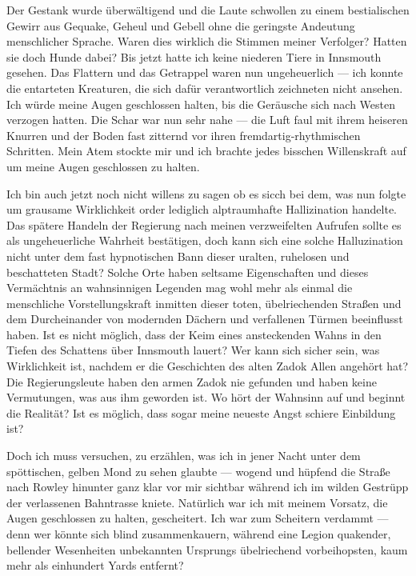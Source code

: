 Der Gestank wurde überwältigend und die Laute schwollen zu einem bestialischen Gewirr aus Gequake, Geheul und Gebell ohne die geringste Andeutung menschlicher Sprache. Waren dies wirklich die Stimmen meiner Verfolger? Hatten sie doch Hunde dabei? Bis jetzt hatte ich keine niederen Tiere in Innsmouth gesehen. Das Flattern und das Getrappel waren nun ungeheuerlich --- ich konnte die entarteten Kreaturen, die sich dafür verantwortlich zeichneten nicht ansehen. Ich würde meine Augen geschlossen halten, bis die Geräusche sich nach Westen verzogen hatten. Die Schar war nun sehr nahe --- die Luft faul mit ihrem heiseren Knurren und der Boden fast zitternd vor ihren fremdartig-rhythmischen Schritten. Mein Atem stockte mir und ich brachte jedes bisschen Willenskraft auf um meine Augen geschlossen zu halten.

Ich bin auch jetzt noch nicht willens zu sagen ob es sicch bei dem, was nun folgte um grausame Wirklichkeit order lediglich alptraumhafte Hallizination handelte. Das spätere Handeln der Regierung nach meinen verzweifelten Aufrufen sollte es als ungeheuerliche Wahrheit bestätigen, doch kann sich eine solche Halluzination nicht unter dem fast hypnotischen Bann dieser uralten, ruhelosen und beschatteten Stadt? Solche Orte haben seltsame Eigenschaften und dieses Vermächtnis an wahnsinnigen Legenden mag wohl mehr als einmal die menschliche Vorstellungskraft inmitten dieser toten, übelriechenden Straßen und dem Durcheinander von modernden Dächern und verfallenen Türmen beeinflusst haben.  Ist es nicht möglich, dass der Keim eines ansteckenden Wahns in den Tiefen des Schattens über Innsmouth lauert? Wer kann sich sicher sein, was Wirklichkeit ist, nachdem er die Geschichten des alten Zadok Allen angehört hat? Die Regierungsleute haben den armen Zadok nie gefunden und haben keine Vermutungen, was aus ihm geworden ist. Wo hört der Wahnsinn auf und beginnt die Realität? Ist es möglich, dass sogar meine neueste Angst schiere Einbildung ist?

Doch ich muss versuchen, zu erzählen, was ich in jener Nacht unter dem spöttischen, gelben Mond zu sehen glaubte --- wogend und hüpfend die Straße nach Rowley hinunter ganz klar vor mir sichtbar während ich im wilden Gestrüpp der verlassenen Bahntrasse kniete. Natürlich war ich mit  meinem Vorsatz, die Augen geschlossen zu halten, gescheitert. Ich war zum Scheitern verdammt --- denn wer könnte sich blind zusammenkauern, während eine Legion quakender, bellender Wesenheiten unbekannten Ursprungs übelriechend vorbeihopsten, kaum mehr als einhundert Yards entfernt?

